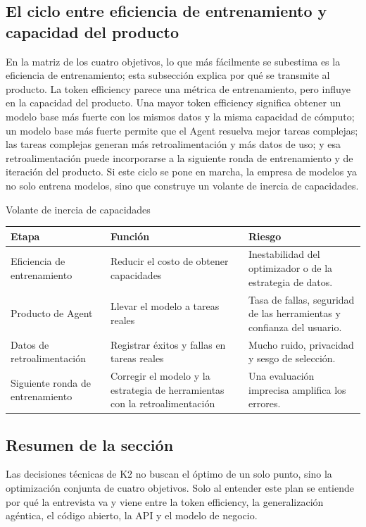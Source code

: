 \subsection{El ciclo entre eficiencia de entrenamiento y capacidad del producto}

En la matriz de los cuatro objetivos, lo que más fácilmente se subestima es la eficiencia de entrenamiento; esta subsección explica por qué se transmite al producto. La token efficiency parece una métrica de entrenamiento, pero influye en la capacidad del producto. Una mayor token efficiency significa obtener un modelo base más fuerte con los mismos datos y la misma capacidad de cómputo; un modelo base más fuerte permite que el Agent resuelva mejor tareas complejas; las tareas complejas generan más retroalimentación y más datos de uso; y esa retroalimentación puede incorporarse a la siguiente ronda de entrenamiento y de iteración del producto. Si este ciclo se pone en marcha, la empresa de modelos ya no solo entrena modelos, sino que construye un volante de inercia de capacidades.

\begin{knowledgebox}{Volante de inercia de capacidades}
\begin{tabularx}{\textwidth}{p{}p{}X}
\toprule
Etapa & Función & Riesgo \\
\midrule
Eficiencia de entrenamiento & Reducir el costo de obtener capacidades & Inestabilidad del optimizador o de la estrategia de datos. \\
Producto de Agent & Llevar el modelo a tareas reales & Tasa de fallas, seguridad de las herramientas y confianza del usuario. \\
Datos de retroalimentación & Registrar éxitos y fallas en tareas reales & Mucho ruido, privacidad y sesgo de selección. \\
Siguiente ronda de entrenamiento & Corregir el modelo y la estrategia de herramientas con la retroalimentación & Una evaluación imprecisa amplifica los errores. \\
\bottomrule
\end{tabularx}
\end{knowledgebox}

\subsection{Resumen de la sección}

Las decisiones técnicas de K2 no buscan el óptimo de un solo punto, sino la optimización conjunta de cuatro objetivos. Solo al entender este plan se entiende por qué la entrevista va y viene entre la token efficiency, la generalización agéntica, el código abierto, la API y el modelo de negocio.
